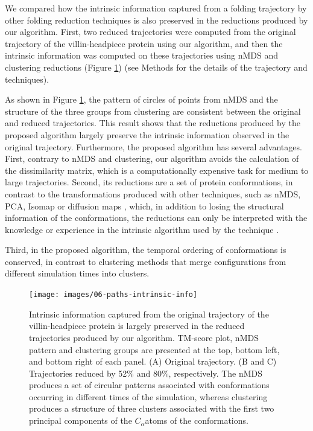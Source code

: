 \documentclass[twocolumn]{bmcart}%
\begin{document}
We compared how the intrinsic information captured from a folding trajectory by other folding reduction techniques is also preserved in the reductions produced by our algorithm. First, two reduced trajectories were computed from the original trajectory of the villin-headpiece protein using our algorithm, and then the intrinsic information was computed on these trajectories using nMDS and clustering reductions (Figure \ref{fig:Comparaciones-PCA-nMDS}) (see Methods for the details of the trajectory and techniques).

As shown in Figure \ref{fig:Comparaciones-PCA-nMDS}, the pattern of circles of points from nMDS and the structure of the three groups from clustering are consistent between the original and reduced trajectories. This result shows that the reductions produced by the proposed algorithm largely preserve the intrinsic information observed in the original trajectory. Furthermore, the proposed algorithm has several advantages. First, contrary to nMDS and clustering, our algorithm avoids the calculation of the dissimilarity matrix, which is a computationally expensive task for medium to large trajectories. Second, its reductions are a set of protein conformations, in contrast to the transformations produced with other techniques, such as nMDS, PCA, Isomap or diffusion maps \cite{RajanSchulten10,Duan2014,Kim2015}, which, in addition to losing the structural information of the conformations, the reductions can only be interpreted with the knowledge or experience in the intrinsic algorithm used by the technique \cite{Cavallo2018}.

Third, in the proposed algorithm, the temporal ordering of conformations is conserved, in contrast to clustering methods \cite{Peng2018} that merge configurations from different simulation times into clusters.

\begin{figure}[!th]
\begin{centering}
\texttt{[image: images/06-paths-intrinsic-info]}
\par\end{centering}
\caption{ Intrinsic information captured from the original trajectory of the villin-headpiece protein is largely preserved in the reduced trajectories produced by our algorithm. TM-score plot, nMDS pattern and clustering groups are presented at the top, bottom left, and bottom right of each panel. (A) Original trajectory. (B and C) Trajectories reduced by 52\% and 80\%, respectively. The nMDS produces a set of circular patterns associated with conformations occurring in different times of the simulation, whereas clustering produces a structure of three clusters associated with the first two principal components of the $C_{\alpha}$atoms of the conformations. \label{fig:Comparaciones-PCA-nMDS}}
\end{figure}
\end{document}

